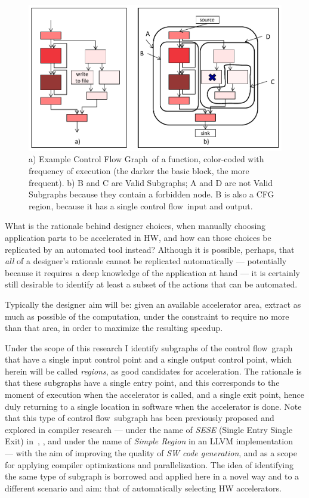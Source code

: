 \documentclass[]{usiinfthesis}
\newcommand{\controlflow}{control flow}
\newcommand{\CFG}{Control Flow Graph}
\begin{document}
\begin{figure}[t]
\centering
\includegraphics[width= .7 \linewidth]{Figs/cfg_example}
\caption{a) Example \CFG\ of a function, color-coded with frequency
  of execution (the darker the basic block, the more frequent). b) B
  and C are Valid Subgraphs; A and D are not Valid Subgraphs because
  they contain a forbidden node. B is also a CFG region, because it has a
  single \controlflow\ input and output.}
\label{fig:cfg-example}
\end{figure}


What is the rationale behind designer choices, when manually choosing
application parts to be accelerated in HW, and how can those choices
be replicated by an automated tool instead? Although it is possible,
perhaps, that \emph{all} of a designer's rationale cannot be
replicated automatically --- potentially because it requires a deep
knowledge of the application at hand --- it is certainly still
desirable to identify at least a subset of the actions that can be
automated.\par

Typically the designer aim will be: given an available accelerator
area, extract as much as possible of the computation, under the
constraint to require no more than that area, in order to maximize the
resulting speedup.\par 

Under the scope of this research I identify subgraphs of the \controlflow\ 
graph that have a single input control point and a single output control point, 
which herein will be called \emph{regions}, as good candidates for 
acceleration. The rationale
is that these subgraphs have a single entry point, and this
corresponds to the moment of execution when the accelerator is called,
and a single exit point, hence duly returning to a single location in
software when the accelerator is done. Note that this type of
\controlflow\ subgraph has been previously proposed and explored in
compiler research --- under the name of \emph{SESE} (Single Entry
Single Exit) in~\cite{AguilarJune16}, \cite{JohnsonJun94}, and under
the name of \emph{Simple Region} in an LLVM
implementation~\cite{LattnerMar04} --- with the aim of improving the
quality of \emph{SW code generation}, and as a scope for applying
compiler optimizations and parallelization. The idea of
identifying the same type of subgraph is borrowed and applied here in a 
novel way and to a different scenario and aim: that of automatically 
selecting HW accelerators.\par
\end{document}
